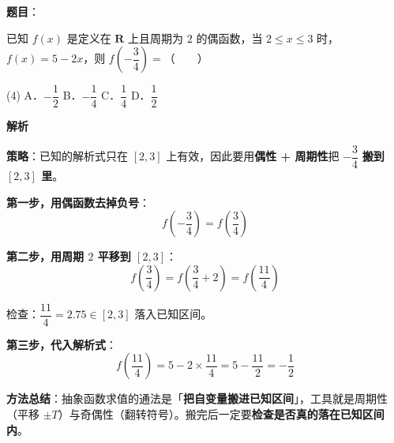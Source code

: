 \begin{answer}

\textbf{题目}：

已知 $f(x)$ 是定义在 $\mathbf{R}$ 上且周期为 $2$ 的偶函数，当 $2\le x\le 3$ 时，$f(x)=5-2x$，则 $f\left(-\dfrac34\right)=$\mbox{（　　）}

\begin{gkopts}(4)
\task A．$-\dfrac12$
\task B．$-\dfrac14$
\task C．$\dfrac14$
\task D．$\dfrac12$
\end{gkopts}

\textbf{解析}

\textbf{策略}：已知的解析式只在 $[2,3]$ 上有效，因此要用\textbf{偶性 + 周期性}把 $-\dfrac34$ \textbf{搬到 $[2,3]$ 里}。

\textbf{第一步，用偶函数去掉负号}：
\nopagebreak[4]
\[f\left(-\frac34\right)=f\left(\frac34\right)\]

\textbf{第二步，用周期 $2$ 平移到 $[2,3]$}：
\nopagebreak[4]
\[f\left(\frac34\right)=f\left(\frac34+2\right)=f\left(\frac{11}{4}\right)\]

检查：$\dfrac{11}{4}=2.75\in[2,3]$  落入已知区间。

\textbf{第三步，代入解析式}：
\nopagebreak[4]
\[f\left(\frac{11}{4}\right)=5-2\times\frac{11}{4}=5-\frac{11}{2}=-\frac12\]

\begin{gktip}
\textbf{方法总结}：抽象函数求值的通法是「\textbf{把自变量搬进已知区间}」，工具就是周期性（平移 $\pm T$）与奇偶性（翻转符号）。搬完后一定要\textbf{检查是否真的落在已知区间内}。
\end{gktip}


\par\medskip

\end{answer}
